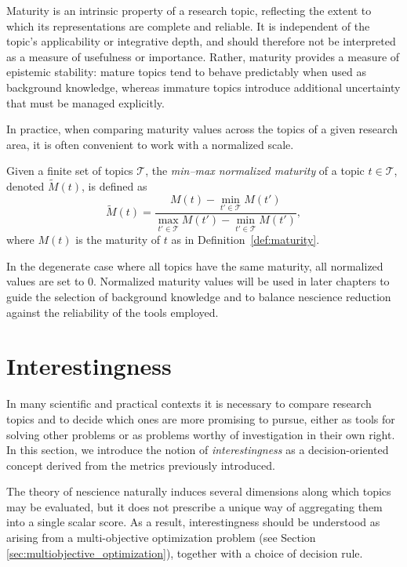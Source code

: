 Maturity is an intrinsic property of a research topic, reflecting the extent to which its representations are complete and reliable. It is independent of the topic’s applicability or integrative depth, and should therefore not be interpreted as a measure of usefulness or importance. Rather, maturity provides a measure of epistemic stability: mature topics tend to behave predictably when used as background knowledge, whereas immature topics introduce additional uncertainty that must be managed explicitly.

In practice, when comparing maturity values across the topics of a given research area, it is often convenient to work with a normalized scale.

\begin{definition}
\label{def:normalized-maturity}
Given a finite set of topics $\mathcal{T}$, the \emph{min--max normalized maturity} of a topic $t \in \mathcal{T}$, denoted $\tilde{M}(t)$, is defined as
\[
\tilde{M}(t) =
\frac{M(t) - \min_{t' \in \mathcal{T}} M(t')}
     {\max_{t' \in \mathcal{T}} M(t') - \min_{t' \in \mathcal{T}} M(t')},
\]
where $M(t)$ is the maturity of $t$ as in Definition~\ref{def:maturity}.
\end{definition}

\noindent
In the degenerate case where all topics have the same maturity, all normalized values are set to $0$. Normalized maturity values will be used in later chapters to guide the selection of background knowledge and to balance nescience reduction against the reliability of the tools employed.

%
%

\section{Interestingness}
\label{sec:interestingness-metrics}

In many scientific and practical contexts it is necessary to compare research topics and to decide which ones are more promising to pursue, either as tools for solving other problems or as problems worthy of investigation in their own right. In this section, we introduce the notion of \emph{interestingness} as a decision-oriented concept derived from the metrics previously introduced.

The theory of nescience naturally induces several dimensions along which topics may be evaluated, but it does not prescribe a unique way of aggregating them into a single scalar score. As a result, interestingness should be understood as arising from a multi-objective optimization problem (see Section \ref{sec:multiobjective_optimization}), together with a choice of decision rule.

